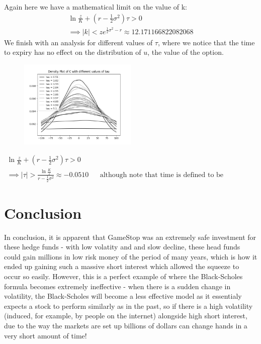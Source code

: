 \documentclass[11pt]{article} %
\begin{document}
Again here we have a mathematical limit on the value of k:
\begin{align}
    \ln{\frac{z}{K}} + (r - \frac{1}{2} \sigma^2)\tau > 0 \\
    \implies |k| < ze^{\frac{1}{2}\sigma^2 - r} \approx 12.171166822082068
\end{align}
We finish with an analysis for different values of $\tau$, where we notice that 
the time to expiry has no effect on the distribution of $u$, the value of the 
option.
\begin{figure}[h] 
    \centering
    \includegraphics[width=0.5\textwidth]{tauvalue.png} 
    \caption[]{}
    \label{tauvalue}
\end{figure}
\begin{align}
    \ln{\frac{z}{K}} + (r - \frac{1}{2} \sigma^2)\tau > 0 \\
    \implies |\tau| > \frac{\ln{\frac{K}{z}}}{r - \frac{1}{2}\sigma^2} 
    \approx -0.0510&& \text{although note that time is 
    defined to be nonegative.}
\end{align}
\section{Conclusion}
In conclusion, it is apparent that GameStop was an extremely safe investment 
for these hedge funds - with low volatity and and slow decline, these head 
funds could gain millions in low risk money of the period of many years, which 
is how it ended up gaining such a massive short interest which allowed the 
squeeze to occur so easily. However, this is a perfect example of where 
the Black-Scholes formula becomes extremely ineffective - when there is a 
sudden change in volatility, the Black-Scholes will become a less effective 
model as it essentialy expects a stock to perform similarly as in the past, 
so if there is a high volatility (induced, for example, by people on the 
internet) alongside high short interest, due to the way the markets are 
set up billions of dollars can change hands in a very short amount of time!
\printbibliography %
\end{document}
